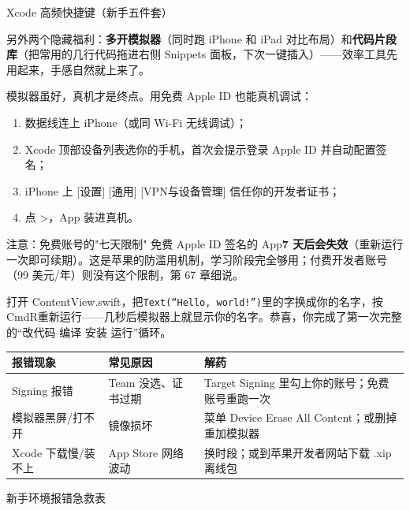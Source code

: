 \begin{center}\small\color{gray}Xcode 高频快捷键（新手五件套）\end{center}

另外两个隐藏福利：\textbf{多开模拟器}（同时跑 iPhone 和 iPad 对比布局）和\textbf{代码片段库}（把常用的几行代码拖进右侧 Snippets 面板，下次一键插入）——效率工具先用起来，手感自然就上来了。


模拟器虽好，真机才是终点。用免费 Apple ID 也能真机调试：

\begin{enumerate}
  \item 数据线连上 iPhone（或同 Wi-Fi 无线调试）；
  \item Xcode 顶部设备列表选你的手机，首次会提示登录 Apple ID 并自动配置签名；
  \item iPhone 上 [设置] [通用] [VPN与设备管理] 信任你的开发者证书；
  \item 点 >，App 装进真机。
\end{enumerate}

\begin{tcbwarn}{注意：免费账号的"七天限制"}
免费 Apple ID 签名的 App\textbf{7 天后会失效}（重新运行一次即可续期）。这是苹果的防滥用机制，学习阶段完全够用；付费开发者账号（99 美元/年）则没有这个限制，第 67 章细说。

\end{tcbwarn}


打开 ContentView.swift，把\texttt{Text(“Hello, world!”)}里的字换成你的名字，按CmdR重新运行——几秒后模拟器上就显示你的名字。恭喜，你完成了第一次完整的“改代码 编译 安装 运行”循环。

\begin{center}
\begin{tabularx}{\linewidth}{|X|X|X|}
\hline
\textbf{报错现象} & \textbf{常见原因} & \textbf{解药} \tabularnewline
\hline
Signing 报错 & Team 没选、证书过期 & Target Signing 里勾上你的账号；免费账号重跑一次 \tabularnewline
模拟器黑屏/打不开 & 镜像损坏 & 菜单 Device Erase All Content；或删掉重加模拟器 \tabularnewline
Xcode 下载慢/装不上 & App Store 网络波动 & 换时段；或到苹果开发者网站下载 .xip 离线包 \tabularnewline
\hline
\end{tabularx}
\end{center}

\begin{center}\small\color{gray}新手环境报错急救表\end{center}

